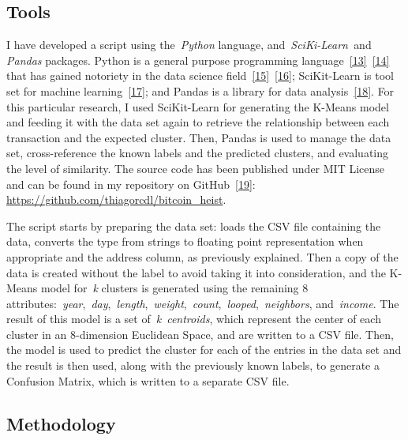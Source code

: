 \documentclass[10pt]{article}
\begin{document}
\par\null

\subsection*{Tools}

{\label{515402}}

I have developed a script using the~\emph{Python} language,
and~\emph{SciKi-Learn~}and \emph{Pandas} packages. Python is a general
purpose programming language~\hyperref[csl:13]{[13]}~\hyperref[csl:14]{[14]} that
has gained notoriety in the data science
field~\hyperref[csl:15]{[15]}~\hyperref[csl:16]{[16]}; SciKit-Learn is tool set
for machine learning~\hyperref[csl:17]{[17]}; and Pandas is a library for
data analysis~\hyperref[csl:18]{[18]}. For this particular research, I used
SciKit-Learn for generating the K-Means model and feeding it with the
data set again to retrieve the relationship between each transaction and
the expected cluster. Then, Pandas is used to manage the data set,
cross-reference the known labels and the predicted clusters, and
evaluating the level of similarity. The source code has been published
under MIT License and can be found in my repository on
GitHub~\hyperref[csl:19]{[19]}:
\url{https://github.com/thiagorcdl/bitcoin\_heist}.

The script starts by preparing the data set: loads the CSV file
containing the data, converts the type from strings to floating point
representation when appropriate and the address column, as previously
explained. Then a copy of the data is created without the label to avoid
taking it into consideration, and the K-Means model for~\emph{k}
clusters is generated using the remaining 8
attributes:~\emph{year},~\emph{day},~\emph{length},~\emph{weight},~\emph{count},~\emph{looped},~\emph{neighbors},
and~\emph{income}. The result of this model is a set
of~\emph{k}~\emph{centroids}, which represent the center of each cluster
in an 8-dimension Euclidean Space, and are written to a CSV file. Then,
the model is used to predict the cluster for each of the entries in the
data set and the result is then used, along with the previously known
labels, to generate a Confusion Matrix, which is written to a separate
CSV file.

\par\null

\subsection*{Methodology}
\end{document}
